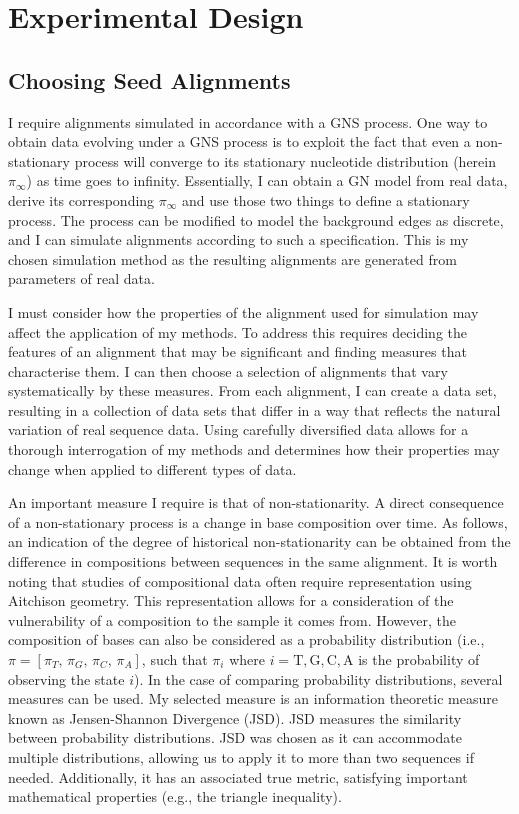 \section{Experimental Design}

\subsection{Choosing Seed Alignments}
I require alignments simulated in accordance with a GNS process. One way to obtain data evolving under a GNS process is to exploit the fact that even a non-stationary process will converge to its stationary nucleotide distribution (herein $\pi_{\infty}$) as time goes to infinity. Essentially, I can obtain a GN model from real data, derive its corresponding $\pi_{\infty}$ and use those two things to define a stationary process. The process can be modified to model the background edges as discrete, and I can simulate alignments according to such a specification. This is my chosen simulation method as the resulting alignments are generated from parameters of real data. 

I must consider how the properties of the alignment used for simulation may affect the application of my methods. To address this requires deciding the features of an alignment that may be significant and finding measures that characterise them. I can then choose a selection of alignments that vary systematically by these measures. From each alignment, I can create a data set, resulting in a collection of data sets that differ in a way that reflects the natural variation of real sequence data. Using carefully diversified data allows for a thorough interrogation of my methods and determines how their properties may change when applied to different types of data.

An important measure I require is that of non-stationarity. A direct consequence of a non-stationary process is a change in base composition over time. As follows, an indication of the degree of historical non-stationarity can be obtained from the difference in compositions between sequences in the same alignment. It is worth noting that studies of compositional data often require representation using Aitchison geometry. This representation allows for a consideration of the vulnerability of a composition to the sample it comes from. However, the composition of bases can also be considered as a probability distribution (i.e., $\pi = [\pi_T,\, \pi_G, \, \pi_C, \, \pi_A]$, such that $\pi_i$ where $i= \mathrm{T}, \mathrm{G}, \mathrm{C}, \mathrm{A}$ is the probability of observing the state $i$). In the case of comparing probability distributions, several measures can be used. My selected measure is an information theoretic measure known as Jensen-Shannon Divergence (JSD). JSD measures the similarity between probability distributions. JSD was chosen as it can accommodate multiple distributions, allowing us to apply it to more than two sequences if needed. Additionally, it has an associated true metric, satisfying important mathematical properties (e.g., the triangle inequality). 

